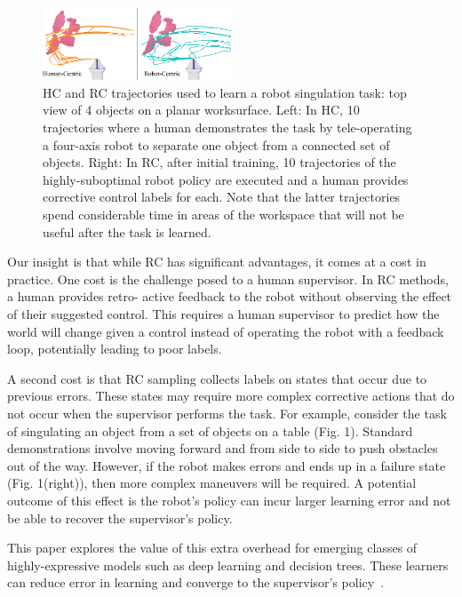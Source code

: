 \documentclass[10pt, conference]{ieeeconf}      %
\begin{document}
\begin{figure}
\center
\includegraphics[width=0.5\textwidth]{f_figs/teaser.eps}
\caption{
    \footnotesize
HC and RC trajectories used to learn a robot singulation task: top view of 4 objects on a planar worksurface.  Left: In HC, 10 trajectories where a human demonstrates the task by tele-operating a four-axis robot to separate one object from a connected set of objects. Right: In RC, after initial training, 10 trajectories of the highly-suboptimal robot policy are executed and a  human provides corrective control labels for each.  Note that the latter trajectories spend considerable time in areas of the workspace that will not be useful after the task is learned.}
\vspace*{-20pt}
\label{fig:teaser}
\end{figure}

Our insight is that while RC has significant advantages, it
comes at a cost in practice. One cost is the challenge posed to
a human supervisor. In RC methods, a human provides retro-
active feedback to the robot without observing the effect of
their suggested control. This requires a human supervisor to
predict how the world will change given a control instead of
operating the robot with a feedback loop, potentially leading
to poor labels.

A second cost is that RC sampling collects labels on states
that occur due to previous errors. These states may require
more complex corrective actions that do not occur when the
supervisor performs the task. For example, consider the task
of singulating an object from a set of objects on a table (Fig.
1). Standard demonstrations involve moving forward and from
side to side to push obstacles out of the way. However, if
the robot makes errors and ends up in a failure state (Fig.
1(right)), then more complex maneuvers will be required.
A potential outcome of this effect is the robot’s policy can
incur larger learning error and not be able to recover the
supervisor’s policy.
 
This paper explores the value of this extra overhead for emerging classes of highly-expressive models such as deep learning and decision trees. These learners can reduce error in learning and converge to the supervisor's policy~\cite{vapnik1992principles}.
\end{document}
